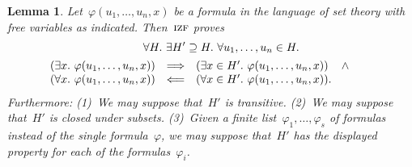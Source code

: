 \documentclass[oneside,reqno]{amsart}
\theoremstyle{definition}
\theoremstyle{plain}
\newtheorem{lemma}[defn]{Lemma}
\theoremstyle{remark}
\renewcommand{\_}{\mathpunct{.}\,}
\newcommand{\?}{\,{:}\,}
\newcommand{\IZF}{\textsc{izf}}
\begin{document}
\begin{lemma}\label{lemma:izf-microstep}
Let~$\varphi(u_1,\ldots,u_n,x)$ be a formula in the language of set
theory with free variables as indicated. Then~$\IZF$ proves
\begin{multline*}
  {\qquad}\forall H\_
  \exists H' \supseteq H\_
  \forall u_1,\ldots,u_n \in H\_ \\
  \begin{array}{@{}rcl@{}}
  (\exists x\_ \varphi(u_1,\ldots,u_n,x)) &\Longrightarrow&
  (\exists x \in H'\_ \varphi(u_1,\ldots,u_n,x)) \quad\mathop{\wedge} \\
  (\forall x\_ \varphi(u_1,\ldots,u_n,x)) &\Longleftarrow&
  (\forall x \in H'\_ \varphi(u_1,\ldots,u_n,x)).\end{array}
  {\qquad}
\end{multline*}
Furthermore: (1)~We may suppose that~$H'$ is transitive. (2)~We may suppose
that~$H'$ is closed under subsets. (3)~Given a finite
list~$\varphi_1,\ldots,\varphi_s$ of formulas instead of the single
formula~$\varphi$, we may suppose that~$H'$ has the displayed property for each
of the formulas~$\varphi_i$.
\end{lemma}
\end{document}

